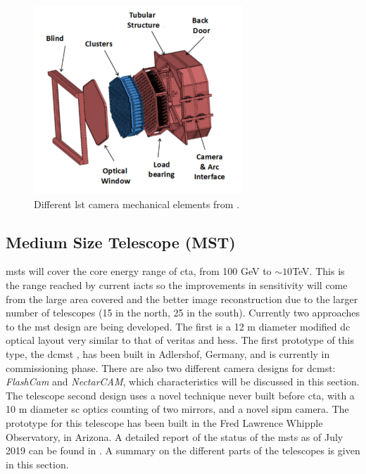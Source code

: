\documentclass[main.tex]{subfiles}
\begin{document}
\begin{figure}
\centering
 \includegraphics[width=0.7\textwidth]{Pictures/LSTcamerastructure.pdf}
  \caption{Different \gls{lst} camera mechanical elements from \cite{2013LSTCamMech}.}
    \label{fig:LSTcammech}
\end{figure}

\subsection{Medium Size Telescope (MST)} \label{sec:MST}

\glspl{mst} will cover the core energy range of \gls{cta}, from 100 GeV to $\sim 10$TeV. This is the range reached by current \glspl{iact} so the improvements in sensitivity will come from the large area covered and the better image reconstruction due to the larger number of telescopes (15 in the north, 25 in the south).
Currently two approaches to the \gls{mst} design are being developed. The first is a 12 m diameter modified \gls{dc} optical layout very similar to that of \gls{veritas} and \gls{hess}. The first prototype of this type, the \gls{dcmst} \cite{2017SCMSTstatus}, has been built in Adlershof, Germany, and is currently in commissioning phase. There are also two different camera designs for \gls{dcmst}: \textit{FlashCam} and \textit{NectarCAM}, which characteristics will be discussed in this section.
The telescope second design uses a novel technique never built before \gls{cta}, with a 10 m diameter \gls{sc} \cite{2017SCMSTstatus} optics counting of two mirrors, and a novel \gls{sipm} camera. The prototype for this telescope has been built in the Fred Lawrence Whipple Observatory, in Arizona. 
A detailed report of the status of the \glspl{mst} as of July 2019 can be found in \cite{2019MSTreport}. A summary on the different parts of the telescopes is given in this section.
\end{document}
